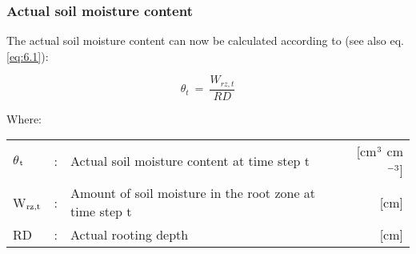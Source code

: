 \subsubsection{Actual soil moisture content}
The actual soil moisture content can now be calculated according to (see also eq. \ref{eq:6.1}):

\begin{equation}
\label{eq:6.34}
\theta_{t} ~=~{\frac{ W_{rz, t}}{RD}} 
\end{equation}

Where:\\[5pt]
\begin{tabularx}{\textwidth}{llXr}
	$\theta$$_{{\rm t}}$ &:& Actual soil moisture content at time step t  & [cm$^{{\rm 3}}$ cm$^{{\rm -3}}$]\\
	W$_{{\rm rz,t}}$ &:& Amount of soil moisture in the root zone at time step t  & [cm]\\
	RD &:& Actual rooting depth  & [cm]\\
\end{tabularx}
%
%
